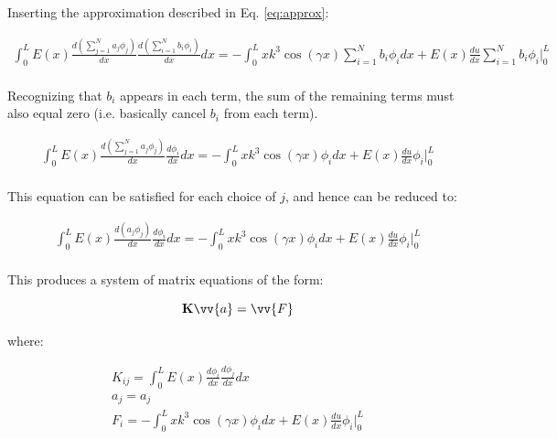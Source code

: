 \documentclass[10pt]{article}
\begin{document}
Inserting the approximation described in Eq. \eqref{eq:approx}:

\begin{equation}
\begin{aligned}
\int_{0}^{L}E(x)\frac{d\left(\sum_{j=1}^{N}a_j\phi_j\right)}{dx}\frac{d\left(\sum_{i=1}^{N}b_i\phi_i\right)}{dx}dx=-\int_{0}^{L}xk^3\cos{(\gamma x)}\sum_{i=1}^{N}b_i\phi_idx+E(x)\frac{du}{dx}\sum_{i=1}^{N}b_i\phi_i\biggr\vert_{0}^{L}\\
\end{aligned}
\end{equation}

Recognizing that \(b_i\) appears in each term, the sum of the remaining terms must also equal zero (i.e. basically cancel \(b_i\) from each term).

\begin{equation}
\begin{aligned}
\int_{0}^{L}E(x)\frac{d\left(\sum_{j=1}^{N}a_j\phi_j\right)}{dx}\frac{d\phi_i}{dx}dx=-\int_{0}^{L}xk^3\cos{(\gamma x)}\phi_idx+E(x)\frac{du}{dx}\phi_i\biggr\vert_{0}^{L}\\
\end{aligned}
\end{equation}

This equation can be satisfied for each choice of \(j\), and hence can be reduced to:

\begin{equation}
\begin{aligned}
\int_{0}^{L}E(x)\frac{d\left(a_j\phi_j\right)}{dx}\frac{d\phi_i}{dx}dx=-\int_{0}^{L}xk^3\cos{(\gamma x)}\phi_idx+E(x)\frac{du}{dx}\phi_i\biggr\vert_{0}^{L}\\
\end{aligned}
\end{equation}

This produces a system of matrix equations of the form:

\begin{equation}
\label{eq:MatrixEqn}
\textbf{K}\vv{a}=\vv{F}
\end{equation}

where:

\begin{equation}
\begin{aligned}
\label{eq:SystemEquations}
K_{ij}=\int_{0}^{L}E(x)\frac{d\phi_i}{dx}\frac{d\phi_j}{dx}dx\\
a_j=a_j\\
F_i=-\int_{0}^{L}xk^3\cos{(\gamma x)}\phi_idx+E(x)\frac{du}{dx}\phi_i\biggr\vert_{0}^{L}\\
\end{aligned}
\end{equation}
\end{document}
